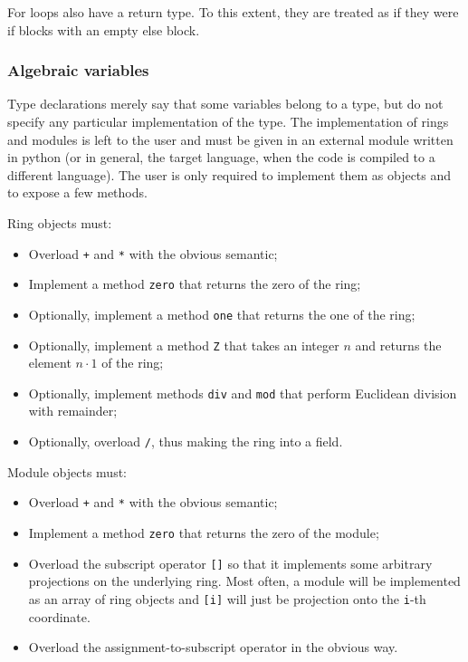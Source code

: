 For loops also have a return type. To this extent, they are treated as
if they were if blocks with an empty else block.



\subsubsection{Algebraic variables}
\label{sec:algebraicvar}
Type declarations merely say that some variables belong to a type, but
do not specify any particular implementation of the type. The
implementation of rings and modules is left to the user and must be
given in an external module written in python (or in general, the
target language, when the code is compiled to a different
language). The user is only required to implement them as objects and
to expose a few methods.

Ring objects must:
\begin{itemize}
\item Overload \lstinline-+- and \lstinline+*+ with the obvious semantic;
\item Implement a method \lstinline-zero- that returns the zero of the ring;
\item Optionally, implement a method \lstinline-one- that returns the
  one of the ring;
\item Optionally, implement a method \lstinline-Z- that takes an
  integer $n$ and returns the element $n\cdot 1$ of the ring;
\item Optionally, implement methods \lstinline+div+ and
  \lstinline+mod+ that perform Euclidean division with remainder;
\item Optionally, overload \lstinline+/+, thus making the ring into a
  field.
\end{itemize}

Module objects must:
\begin{itemize}
\item Overload \lstinline-+- and \lstinline+*+ with the obvious semantic;
\item Implement a method \lstinline-zero- that returns the zero of the
  module;
\item Overload the subscript operator \lstinline+[]+ so that it
  implements some arbitrary projections on the underlying ring. Most
  often, a module will be implemented as an array of ring objects and
  \lstinline+[i]+ will just be projection onto the \lstinline+i+-th
  coordinate.
\item Overload the assignment-to-subscript operator in the obvious
  way.
\end{itemize}

